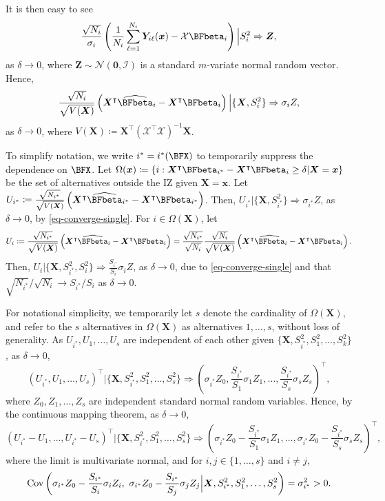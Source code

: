\documentclass[ijoc,nonblindrev]{informs3}
\def\Cov{{\rm Cov}}
\def\bx{{\bm x}}
\def\bX{{\bm X}}
\def\bY{{\bm Y}}
\def\bZ{{\bm Z}}
\def\cN{{\mathcal N}}
\def\cX{{\mathcal X}}
\def\cI{{\mathcal I}}
\begin{document}
It is then easy to see
\[\frac{\sqrt{N_i}}{\sigma_i} \left(\frac{1}{N_i}\sum_{\ell=1}^{N_i} \bY_{i\ell}(\bx) - \cX \BFbeta_i \right) \Big| S_i^2 \Rightarrow  \bZ,\]
as $\delta\to 0$,
where $\bZ \sim \cN(\bm 0, \cI)$ is a  standard $m$-variate normal random vector.
Hence,
\begin{equation}\label{eq-converge-single}
\frac{\sqrt{N_i}}{\sqrt{V(\bX)}} \left(\bX^\intercal \widehat{\BFbeta}_i  - \bX^\intercal \BFbeta_i \right) \Big| \{\bX, S_i^2\} \Rightarrow  \sigma_i Z,
\end{equation}
as $\delta\to 0$, where $V(\bX)\coloneqq \bX^\intercal (\cX^\intercal \cX)^{-1} \bX$.

To simplify notation, we write $i^*=i^*(\BFX)$ to temporarily suppress the dependence on $\BFX$.
Let $\Omega(\bx) \coloneqq \{i: \bX^\intercal \BFbeta_{i^*} - \bX^\intercal \BFbeta_i  \geq \delta | \bX=\bx\}$ be the set of alternatives outside the IZ given $\bX=\bx$.
Let $U_{i^*} \coloneqq \frac{\sqrt{N_{i^*}}}{\sqrt{V(\bX)}} \left(\bX^\intercal \widehat{\BFbeta}_{i^*}  - \bX^\intercal \BFbeta_{i^*} \right)$.
Then, $U_{i^*} | \{\bX, S_{i^*}^2\} \Rightarrow  \sigma_{i^*} Z$, as $\delta\to 0$, by \eqref{eq-converge-single}.
For $i \in \Omega(\bX)$, let
$$U_i \coloneqq \frac{\sqrt{N_{i^*}}}{\sqrt{V(\bX)}} \left(\bX^\intercal \widehat{\BFbeta}_i  - \bX^\intercal \BFbeta_i \right) = \frac{\sqrt{N_{i^*}}}{\sqrt{N_i}} \frac{\sqrt{N_i}}{\sqrt{V(\bX)}} \left(\bX^\intercal \widehat{\BFbeta}_i  - \bX^\intercal \BFbeta_i \right).$$
Then, $U_i | \{\bX, S_{i^*}^2, S_i^2\} \Rightarrow  \frac{S_{i^*}}{S_i}\sigma_i Z$, as $\delta\to 0$, due to \eqref{eq-converge-single} and that $\sqrt{N_{i^*}}/\sqrt{N_i} \to S_{i^*}/S_i$ as $\delta \to 0$.

For notational simplicity, we temporarily let $s$ denote the cardinality of $\Omega(\bX)$, and refer to the $s$ alternatives in $\Omega(\bX)$ as alternatives $1,\ldots,s$, without loss of generality.
As $U_{i^*},U_1,\ldots,U_s$ are independent of each other given $\{\bX, S_{i^*}^2, S_1^2, \ldots, S_k^2\}$,
as $\delta\to 0$,
$$
(U_{i^*},U_1,\ldots,U_s)^\intercal \big| \{\bX, S_{i^*}^2, S_1^2, \ldots, S_s^2\} \Rightarrow \left(\sigma_{i^*} Z_0,\frac{S_{i^*}}{S_1}\sigma_1 Z_1,\ldots,\frac{S_{i^*}}{S_s}\sigma_s Z_s\right)^\intercal,
$$
where $Z_0,Z_1,\ldots,Z_s$ are independent standard normal random variables.
Hence, by the continuous mapping theorem, as $\delta\to 0$,
\begin{equation}\label{eq-asy-normal}
(U_{i^*}-U_1,\ldots,U_{i^*}-U_s)^\intercal \big| \{\bX, S_{i^*}^2, S_1^2, \ldots, S_s^2\} \Rightarrow
\left(\sigma_{i^*} Z_0 - \frac{S_{i^*}}{S_1}\sigma_1 Z_1,\ldots,\sigma_{i^*} Z_0 - \frac{S_{i^*}}{S_s}\sigma_s Z_s\right)^\intercal,
\end{equation}
where the limit is multivariate normal, and for $i,j\in \{1,\ldots,s\}$ and $i\neq j$,
\begin{equation}\label{eq-asy-cov}
\Cov\left(\sigma_{i^*} Z_0 - \frac{S_{i^*}}{S_i}\sigma_i Z_i,\ \sigma_{i^*} Z_0 - \frac{S_{i^*}}{S_j}\sigma_j Z_j \Big| \bX, S_{i^*}^2, S_1^2, \ldots, S_s^2\right)= \sigma_{i^*}^2 >0.
\end{equation}
\end{document}

